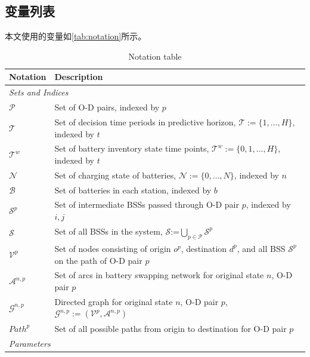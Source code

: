 \documentclass[12pt,hyperref,a4paper,UTF8]{ctexart}
\begin{document}
\subsection{变量列表}

本文使用的变量如\autoref{tab:notation}所示。


\begin{table}[!htbp]
  \centering
  \caption{Notation table}
  \label{tab:notation}
  \footnotesize
  \setlength{\tabcolsep}{1pt}
  \renewcommand{\arraystretch}{0.85}
  \begin{tabular}{@{}lp{13cm}@{}}
    \toprule
    \textbf{Notation} & \textbf{Description} \\
    \midrule
    \multicolumn{2}{l}{\textit{Sets and Indices}} \\
    $\mathcal{P}$ & Set of O-D pairs, indexed by $p$\\
    $\mathcal{T}$ & Set of decision time periods in predictive horizon, $\mathcal{T}:=\{1,\dots,H\}$, indexed by $t$ \\
    $\mathcal{T}^{w}$ & Set of battery inventory state time points, $\mathcal{T}^{w}:=\{0,1,\dots,H\}$, indexed by $t$ \\
    $\mathcal{N}$ & Set of charging state of batteries, $\mathcal{N}:=\{0,\dots,N\}$, indexed by $n$\\
    $\mathcal{B}$ & Set of batteries in each station, indexed by $b$ \\
    $\mathcal{S}^p$ & Set of intermediate BSSs passed through O-D pair $p$, indexed by $i, j$ \\
    $\mathcal{S}$ & Set of all BSSs in the system, $\mathcal{S}$:=$\bigcup_{p \in \mathcal{P}}\mathcal{S}^p$\\
    $\mathcal{V}^p$ & Set of nodes consisting of origin $o^p$, destination $d^p$, and all BSS $\mathcal{S}^p$ on the path of O-D pair $p$ \\  
    $\mathcal{A}^{n,p}$ & Set of arcs in battery swapping network for original state $n$, O-D pair $p$ \\
    $\mathcal{G}^{n,p}$ & Directed graph for original state $n$, O-D pair $p$, $\mathcal{G}^{n,p}:=(\mathcal{V}^p,\mathcal{A}^{n,p})$ \\
    $Path^p$ & Set of all possible paths from origin to destination for O-D pair $p$ \\
    \midrule
    \multicolumn{2}{l}{\textit{Parameters}} \\

\end{tabular}
\end{table}
\end{document}
